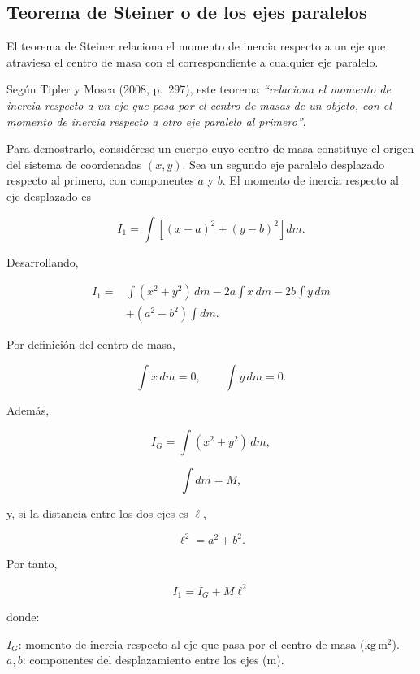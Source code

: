 \documentclass[11pt,a4paper]{article}
\newenvironment{subsectionbody}
{%
    \begin{list}{}{%
        \setlength{\leftmargin}{0.6cm}%
        \setlength{\rightmargin}{0cm}%
        \setlength{\topsep}{0pt}%
        \setlength{\partopsep}{0pt}%
        \setlength{\parsep}{0pt}%
        \setlength{\itemsep}{0pt}%
    }%
    \item\relax
}
{%
    \end{list}
}
\begin{document}
\subsection{Teorema de Steiner o de los ejes paralelos}
\begin{subsectionbody}

El teorema de Steiner relaciona el momento de inercia respecto a un
eje que atraviesa el centro de masa con el correspondiente a cualquier
eje paralelo.

Según Tipler y Mosca (2008, p.~297), este teorema
\textit{``relaciona el momento de inercia respecto a un eje que pasa
por el centro de masas de un objeto, con el momento de inercia respecto
a otro eje paralelo al primero''}.

Para demostrarlo, considérese un cuerpo cuyo centro de masa constituye
el origen del sistema de coordenadas $(x,y)$. Sea un segundo eje
paralelo desplazado respecto al primero, con componentes $a$ y $b$.
El momento de inercia respecto al eje desplazado es

\[
I_1=
\int
\left[
(x-a)^2+(y-b)^2
\right]dm.
\]

Desarrollando,

\[
\begin{aligned}
I_1={}&
\int(x^2+y^2)\,dm
-2a\int x\,dm
-2b\int y\,dm \\
&+(a^2+b^2)\int dm.
\end{aligned}
\]

Por definición del centro de masa,

\[
\int x\,dm=0,
\qquad
\int y\,dm=0.
\]

Además,

\[
I_G=\int(x^2+y^2)\,dm,
\]

\[
\int dm=M,
\]

y, si la distancia entre los dos ejes es $\ell$,

\[
\ell^2=a^2+b^2.
\]

Por tanto,

\begin{equation}
\boxed{
I_1=I_G+M\ell^2
}
\label{eq:steiner}
\end{equation}

donde:

\hspace*{0.5cm}$I_G$: momento de inercia respecto al eje que pasa por
el centro de masa ($\mathrm{kg\,m^2}$).\\
\hspace*{0.5cm}$a,b$: componentes del desplazamiento entre los ejes
($\mathrm{m}$).

\end{subsectionbody}
\end{document}

